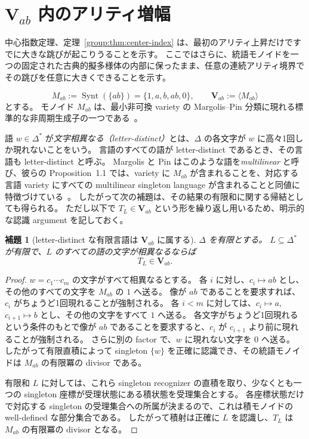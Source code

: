 \documentclass[10pt,a4paper]{ltjsarticle}
\newtheorem{lemma}[theorem]{補題}
\theoremstyle{definition}
\theoremstyle{remark}
\begin{document}
\section{\texorpdfstring{$\mathbf V_{ab}$}{Vab} 内のアリティ増幅}
\label{sec:vab-arity}

中心指数定理、定理~\ref{group:thm:center-index} は、最初のアリティ上昇だけですでに大きな跳びが起こりうることを示す。
ここではさらに、統語モノイドを一つの固定された古典的擬多様体の内部に保ったまま、任意の連続アリティ境界でその跳びを任意に大きくできることを示す。

\[
M_{ab}:=\operatorname{Synt}(\{ab\})
=\{1,a,b,ab,0\},
\qquad
\mathbf V_{ab}:=\langle M_{ab}\rangle
\]
とする。
モノイド $M_{ab}$ は、最小非可換 variety の Margolis--Pin 分類に現れる標準的な非周期生成子の一つである~\cite{MargolisPin1984}。

語 $w\in\Delta^*$ が\emph{文字相異なる（letter-distinct）}とは、$\Delta$ の各文字が $w$ に高々1回しか現れないことをいう。
言語のすべての語が letter-distinct であるとき、その言語も letter-distinct と呼ぶ。
Margolis と Pin はこのような語を\emph{multilinear} と呼び、彼らの Proposition~1.1 では、variety に $M_{ab}$ が含まれることを、対応する言語 variety にすべての multilinear singleton language が含まれることと同値に特徴づけている~\cite[Proposition~1.1]{MargolisPin1984}。
したがって次の補題は、その結果の有限和に関する帰結としても得られる。
ただし以下で $T_L\in\mathbf V_{ab}$ という形を繰り返し用いるため、明示的な認識 argument を記しておく。

\begin{lemma}[letter-distinct な有限言語は $\mathbf V_{ab}$ に属する]
\label{vab:lem:letterdistinct}
$\Delta$ を有限とする。
$L\subseteq\Delta^*$ が有限で、$L$ のすべての語の文字が相異なるならば
\[
T_L\in\mathbf V_{ab}.
\]
\end{lemma}

\begin{proof}
$w=c_1\cdots c_m$ の文字がすべて相異なるとする。
各 $i$ に対し、$c_i\mapsto ab$ とし、その他のすべての文字を $M_{ab}$ の $1$ へ送る。
像が $ab$ であることを要求すれば、$c_i$ がちょうど1回現れることが強制される。
各 $i<m$ に対しては、$c_i\mapsto a$, $c_{i+1}\mapsto b$ とし、その他の文字をすべて $1$ へ送る。
各文字がちょうど1回現れるという条件のもとで像が $ab$ であることを要求すると、$c_i$ が $c_{i+1}$ より前に現れることが強制される。
さらに別の factor で、$w$ に現れない文字を $0$ へ送る。
したがって有限直積によって singleton $\{w\}$ を正確に認識でき、その統語モノイドは $M_{ab}$ の有限冪の divisor である。

有限和 $L$ に対しては、これら singleton recognizer の直積を取り、少なくとも一つの singleton 座標が受理状態にある積状態を受理集合とする。
各座標状態だけで対応する singleton の受理集合への所属が決まるので、これは積モノイドの well-defined な部分集合である。
したがって積射は正確に $L$ を認識し、$T_L$ は $M_{ab}$ の有限冪の divisor となる。
\end{proof}
\end{document}
